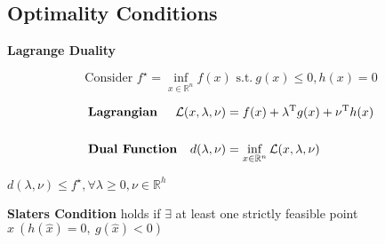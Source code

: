 
\subsection{Optimality Conditions}

\begin{sstTitleBox}{\center\textbf{\large
			Lagrange Duality
		}}
	\begin{centering}
		\begin{sstOnlyFrame}
			\vspace{-1.5mm}
			\begin{equation}\text{Consider }
				f^\star = \inf_{x\in\mathcal{\mathbb{R}}^n}f(x)
				\text{ s.t.}\ g(x)\le0,h(x)=0
				\label{eq:dual}
			\end{equation}
		\end{sstOnlyFrame}


		\begin{sstFrame}
			{\color{white}
				\vspace{-2mm}
				\[\begin{aligned}
						 & \textbf{Lagrangian}
						 & \hspace{-4mm}	\mathcal{L}(x,\lambda,\nu)
						 & = f(x) + \lambda\T g(x)+\nu\T h(x)
						\\
						\\
						 & \textbf{Dual Function}
						 & \hspace{-4mm}		d(\lambda,\nu)            & = \inf_{x \in \mathcal{\mathbb{R}}^n}\mathcal{L}(x,\lambda,\nu)
					\end{aligned}\]
				\vspace{-2.7mm}
			}
		\end{sstFrame}
	\end{centering}
\end{sstTitleBox}



\begin{proposition}
	$d(\lambda,\nu)\le f^\star,\forall\lambda\ge0,\nu\in\mathbb{R}^{h}$
\end{proposition}

\begin{definition}
	\textbf{Slaters Condition} holds if $\exists$
	at least one
	strictly feasible point
	$\hat{x}{\ (h(\hat{x})=0,\ g(\hat{x})<0)}$
\end{definition}

